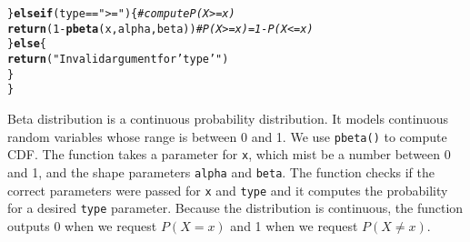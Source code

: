 \documentclass{article}\usepackage[]{graphicx}\usepackage[]{xcolor}
\makeatletter
\newcommand{\hlnum}[1]{\textcolor[rgb]{0.686,0.059,0.569}{#1}}%
\newcommand{\hlsng}[1]{\textcolor[rgb]{0.192,0.494,0.8}{#1}}%
\newcommand{\hlcom}[1]{\textcolor[rgb]{0.678,0.584,0.686}{\textit{#1}}}%
\newcommand{\hlopt}[1]{\textcolor[rgb]{0,0,0}{#1}}%
\newcommand{\hldef}[1]{\textcolor[rgb]{0.345,0.345,0.345}{#1}}%
\newcommand{\hlkwa}[1]{\textcolor[rgb]{0.161,0.373,0.58}{\textbf{#1}}}%
\newcommand{\hlkwd}[1]{\textcolor[rgb]{0.737,0.353,0.396}{\textbf{#1}}}%
\newenvironment{kframe}{%
 \def\at@end@of@kframe{}%
 \ifinner\ifhmode%
  \def\at@end@of@kframe{\end{minipage}}%
  \begin{minipage}{\columnwidth}%
 \fi\fi%
 \def\FrameCommand##1{\hskip\@totalleftmargin \hskip-\fboxsep
 \colorbox{shadecolor}{##1}\hskip-\fboxsep
     \hskip-\linewidth \hskip-\@totalleftmargin \hskip\columnwidth}%
 \MakeFramed {\advance\hsize-\width
   \@totalleftmargin\z@ \linewidth\hsize
   \@setminipage}}%
 {\par\unskip\endMakeFramed%
 \at@end@of@kframe}
\newenvironment{knitrout}{}{} %
\makeatother
\begin{document}
\begin{enumerate}
\begin{knitrout}
\begin{kframe}
\begin{alltt}
  \hldef{\}}\hlkwa{else if} \hldef{(type} \hlopt{==} \hlsng{">="}\hldef{)\{}  \hlcom{#compute P(X>=x)}
    \hlkwd{return}\hldef{(}\hlnum{1} \hlopt{-} \hlkwd{pbeta}\hldef{(x, alpha, beta))} \hlcom{#P(X>=x) = 1 - P(X<=x)}
  \hldef{\}}\hlkwa{else}\hldef{\{}
    \hlkwd{return}\hldef{(}\hlsng{"Invalid argument for 'type'"}\hldef{)}
  \hldef{\}}
\hldef{\}}
\end{alltt}
\end{kframe}
\end{knitrout}
Beta distribution is a continuous probability distribution. It models continuous random variables whose range is between 0 and 1. We use \texttt{pbeta()} to compute CDF. The function takes a parameter for \texttt{x}, which mist be a number between 0 and 1, and the shape parameters \texttt{alpha} and \texttt{beta}. The function checks if the correct parameters were passed for \texttt{x} and \texttt{type} and it computes the probability for a desired \texttt{type} parameter. Because the distribution is continuous, the function outputs 0 when we request $P(X=x)$ and 1 when we request $P(X \neq x)$.
\end{enumerate}

\end{document}
